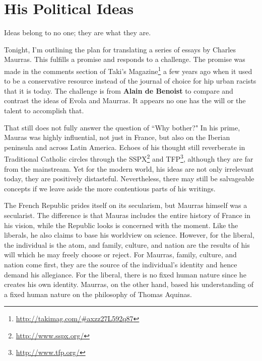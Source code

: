 \section{His Political Ideas}

\begin{quotex}
Ideas belong to no one; they are what they are. 

\end{quotex}
Tonight, I'm outlining the plan for translating a series of essays by Charles Maurras. This fulfills a promise and responds to a challenge. The promise was made in the comments section of Taki's Magazine\footnote{\url{http://takimag.com/\#axzz27L592q87}} a few years ago when it used to be a conservative resource instead of the journal of choice for hip urban racists that it is today. The challenge is from \textbf{Alain de Benoist} to compare and contrast the ideas of Evola and Maurras. It appears no one has the will or the talent to accomplish that.

That still does not fully answer the question of ``Why bother?" In his prime, Mauras was highly influential, not just in France, but also on the Iberian peninsula and across Latin America. Echoes of his thought still reverberate in Traditional Catholic circles through the SSPX\footnote{\url{http://www.sspx.org/}} and TFP\footnote{\url{http://www.tfp.org/}}, although they are far from the mainstream. Yet for the modern world, his ideas are not only irrelevant today, they are positively distasteful. Nevertheless, there may still be salvageable concepts if we leave aside the more contentious parts of his writings.

The French Republic prides itself on its secularism, but Maurras himself was a secularist. The difference is that Mauras includes the entire history of France in his vision, while the Republic looks is concerned with the moment. Like the liberals, he also claims to base his worldview on science. However, for the liberal, the individual is the atom, and family, culture, and nation are the results of his will which he may freely choose or reject. For Maurras, family, culture, and nation come first, they are the source of the individual's identity and hence demand his allegiance. For the liberal, there is no fixed human nature since he creates his own identity. Maurras, on the other hand, based his understanding of a fixed human nature on the philosophy of Thomas Aquinas.

